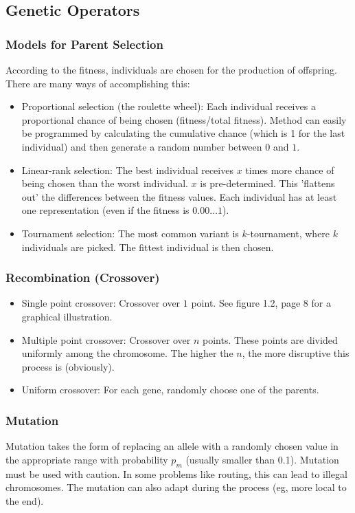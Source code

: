 \documentclass[12pt]{article}
\begin{document}
\subsection{Genetic Operators}
\subsubsection{Models for Parent Selection}
According to the fitness, individuals are chosen for the production of offspring. There are many ways of accomplishing this:
\begin{itemize}
\item Proportional selection (the roulette wheel): Each individual receives a proportional chance of being chosen (fitness/total fitness). Method can easily be programmed by calculating the cumulative chance (which is 1 for the last individual) and then generate a random number between $0$ and $1$.
\item Linear-rank selection: The best individual receives $x$ times more chance of being chosen than the worst individual. $x$ is pre-determined. This 'flattens out' the differences between the fitness values. Each individual has at least one representation (even if the fitness is $0.00\dots1$).
\item Tournament selection: The most common variant is $k$-tournament, where $k$ individuals are picked. The fittest individual is then chosen.
\end{itemize}
\subsubsection{Recombination (Crossover)}
\begin{itemize}
\item Single point crossover: Crossover over $1$ point. See figure 1.2, page 8 for a graphical illustration.
\item Multiple point crossover: Crossover over $n$ points. These points are divided uniformly among the chromosome. The higher the $n$, the more disruptive this process is (obviously).
\item Uniform crossover: For each gene, randomly choose one of the parents.
\end{itemize}
\subsubsection{Mutation}
Mutation takes the form of replacing an allele with a randomly chosen value in the appropriate range with probability $p_m$ (usually smaller than 0.1). Mutation must be used with caution. In some problems like routing, this can lead to illegal chromosomes. The mutation can also adapt during the process (eg, more local to the end).
\end{document}
